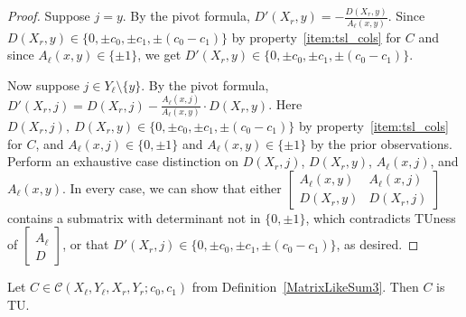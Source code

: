 \begin{proof}
    Suppose $j = y$. By the pivot formula, $D' (X_{r}, y) = -\frac{D (X_{r}, y)}{A_{\ell} (x, y)}$. Since $D (X_{r}, y) \in \{0, \pm c_{0}, \pm c_{1}, \pm (c_{0} - c_{1})\}$ by property~\ref{item:tsl_cols} for $C$ and since $A_{\ell} (x, y) \in \{\pm 1\}$, we get $D' (X_{r}, y) \in \{0, \pm c_{0}, \pm c_{1}, \pm (c_{0} - c_{1})\}$.

    Now suppose $j \in Y_{\ell} \setminus \{y\}$. By the pivot formula, $D' (X_{r}, j) = D (X_{r}, j) - \frac{A_{\ell} (x, j)}{A_{\ell} (x, y)} \cdot D (X_{r}, y)$. Here $D (X_{r}, j), \ D (X_{r}, y) \in \{0, \pm c_{0}, \pm c_{1}, \pm (c_{0} - c_{1})\}$ by property~\ref{item:tsl_cols} for $C$, and $A_{\ell} (x, j) \in \{0, \pm 1\}$ and $A_{\ell} (x, y) \in \{\pm 1\}$ by the prior observations. Perform an exhaustive case distinction on $D (X_{r}, j)$, $D (X_{r}, y)$, $A_{\ell} (x, j)$, and $A_{\ell} (x, y)$. In every case, we can show that either $\begin{bmatrix} A_{\ell} (x, y) & A_{\ell} (x, j) \\ D (X_{r}, y) & D (X_{r}, j) \end{bmatrix}$ contains a submatrix with determinant not in $\{0, \pm 1\}$, which contradicts TUness of $\begin{bmatrix} A_{\ell} \\ D \end{bmatrix}$, or that $D' (X_{r}, j) \in \{0, \pm c_{0}, \pm c_{1}, \pm (c_{0} - c_{1})\}$, as desired. 
\end{proof}

\begin{lemma}
    \label{lem:three_sum_like_tu}
    \leanok
    Let $C \in \mathcal{C} (X_{\ell}, Y_{\ell}, X_{r}, Y_{r}; c_{0}, c_{1})$ from Definition~\ref{MatrixLikeSum3}. Then $C$ is TU.
\end{lemma}

